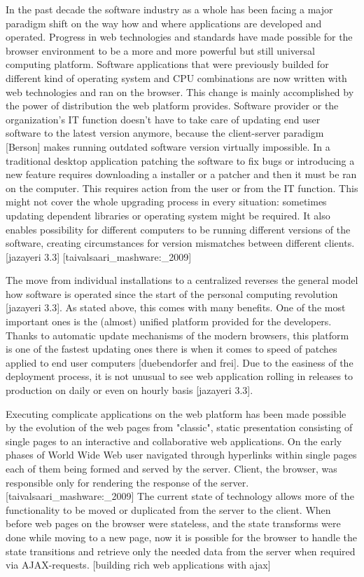 In the past decade the software industry as a whole has been facing a major paradigm shift on the way how and where applications are developed and operated. Progress in web technologies and standards have made possible for the browser environment to be a more and more powerful but still universal computing platform. Software applications that were previously builded for different kind of operating system and CPU combinations are now written with web technologies and ran on the browser. This change is mainly accomplished by the power of distribution the web platform provides. Software provider or the organization's IT function doesn't have to take care of updating end user software to the latest version anymore, because the client-server paradigm [Berson] makes running outdated software version virtually impossible. In a traditional desktop application patching the software to fix bugs or introducing a new feature requires downloading a installer or a patcher and then it must be ran on the computer. This requires action from the user or from the IT function. This might not cover the whole upgrading process in every situation: sometimes updating dependent libraries or operating system might be required. It also enables possibility for different computers to be running different versions of the software, creating circumstances for version mismatches between different clients. [jazayeri 3.3] [taivalsaari_mashware:_2009]

The move from individual installations to a centralized reverses the general model how software is operated since the start of the personal computing revolution [jazayeri 3.3]. As stated above, this comes with many benefits. One of the most important ones is the (almost) unified platform provided for the developers. Thanks to automatic update mechanisms of the modern browsers, this platform is one of the fastest updating ones there is when it comes to speed of patches applied to end user computers [duebendorfer and frei]. Due to the easiness of the deployment process, it is not unusual to see web application rolling in releases to production on daily or even on hourly basis [jazayeri 3.3].

Executing complicate applications on the web platform has been made possible by the evolution of the web pages from "classic", static presentation consisting of single pages to an interactive and collaborative web applications. On the early phases of World Wide Web user navigated through hyperlinks within single pages each of them being formed and served by the server. Client, the browser, was responsible only for rendering the response of the server. [taivalsaari_mashware:_2009] The current state of technology allows more of the functionality to be moved or duplicated from the server to the client. When before web pages on the browser were stateless, and the state transforms were done while moving to a new page, now it is possible for the browser to handle the state transitions and retrieve only the needed data from the server when required via AJAX-requests. [building rich web applications with ajax] 

